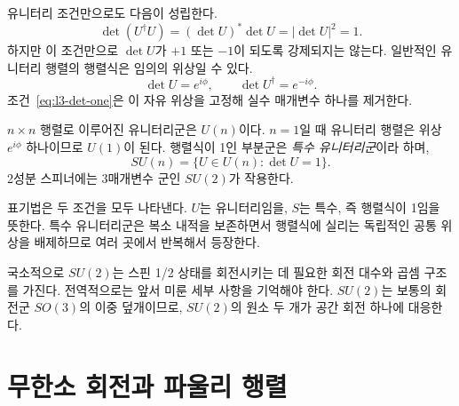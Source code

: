 유니터리 조건만으로도 다음이 성립한다.
\begin{equation}
\det(U^\dagger U)=
(\det U)^*\det U
=|\det U|^2=1.
\end{equation}
하지만 이 조건만으로 \(\det U\)가 \(+1\) 또는 \(-1\)이 되도록 강제되지는 않는다. 일반적인 유니터리 행렬의 행렬식은 임의의 위상일 수 있다.
\begin{equation}
\det U=e^{i\phi},
\qquad
\det U^\dagger=e^{-i\phi}.
\end{equation}
조건~\eqref{eq:l3-det-one}은 이 자유 위상을 고정해 실수 매개변수 하나를 제거한다.

\begin{classroomqa}
\end{classroomqa}

\(n\times n\) 행렬로 이루어진 유니터리군은 \(U(n)\)이다. \(n=1\)일 때 유니터리 행렬은 위상 \(e^{i\phi}\) 하나이므로 \(U(1)\)이 된다. 행렬식이 1인 부분군은 \emph{특수 유니터리군}이라 하며,
\begin{equation}
SU(n)=\{U\in U(n):\det U=1\}.
\end{equation}
2성분 스피너에는 3매개변수 군인 \(SU(2)\)가 작용한다.

표기법은 두 조건을 모두 나타낸다. \(U\)는 유니터리임을, \(S\)는 특수, 즉 행렬식이 1임을 뜻한다. 특수 유니터리군은 복소 내적을 보존하면서 행렬식에 실리는 독립적인 공통 위상을 배제하므로 여러 곳에서 반복해서 등장한다.

국소적으로 \(SU(2)\)는 스핀 1/2 상태를 회전시키는 데 필요한 회전 대수와 곱셈 구조를 가진다. 전역적으로는 앞서 미룬 세부 사항을 기억해야 한다. \(SU(2)\)는 보통의 회전군 \(SO(3)\)의 이중 덮개이므로, \(SU(2)\)의 원소 두 개가 공간 회전 하나에 대응한다. 

\section{무한소 회전과 파울리 행렬}

\begin{classroomqa}
\end{classroomqa}

